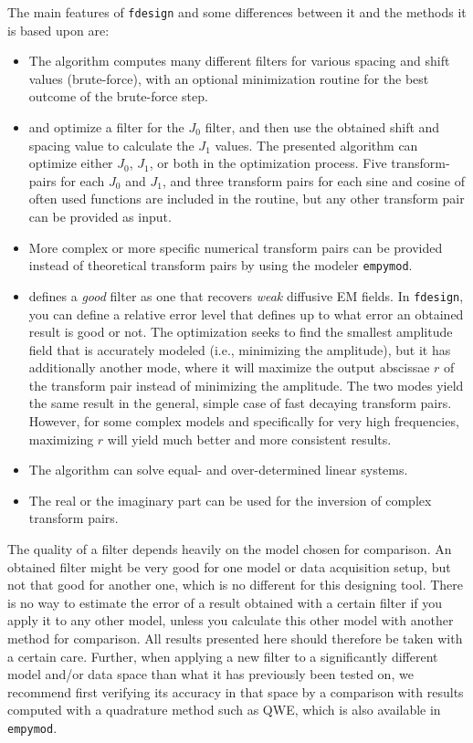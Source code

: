 \documentclass[paper,twocolumn,twoside]{geophysics}
\begin{document}
The main features of \texttt{fdesign} and some differences between it and the
methods it is based upon are:
\begin{itemize}
  \item The algorithm computes many different filters for various spacing and
    shift values (brute-force), with an optional minimization routine for
    the best outcome of the brute-force step.
  \item \cite{GP.07.Kong} and \cite{GEO.12.Key} optimize a filter for the $J_0$
    filter, and then use the obtained shift and spacing value to calculate the
    $J_1$ values. The presented algorithm can optimize either $J_0$, $J_1$, or
    both in the optimization process. Five transform-pairs for each $J_0$ and
    $J_1$, and three transform pairs for each sine and cosine of often used
    functions are included in the routine, but any other transform pair can be
    provided as input.
  \item More complex or more specific numerical transform  pairs  can be
    provided instead of theoretical transform pairs by using the modeler
    \texttt{empymod}.
  \item \cite{GP.07.Kong} defines a \emph{good} filter as one that recovers
    \emph{weak} diffusive EM fields. In  \texttt{fdesign}, you can define a
    relative error level that defines up to what error an obtained result is
    good or not. The optimization seeks to find the smallest amplitude field
    that is accurately modeled (i.e., minimizing the amplitude), but it has
    additionally another mode, where it will maximize the output abscissae $r$
    of the transform pair instead of minimizing the amplitude. The two modes
    yield the same result in the general, simple case of fast decaying
    transform pairs. However, for some complex models and specifically for very
    high frequencies, maximizing $r$ will yield much better and more consistent
    results.
  \item The algorithm can solve equal- and over-determined
    linear systems.
  \item The real or the imaginary part can be used for the inversion of complex
    transform pairs.
\end{itemize}

The quality of a filter depends heavily on the model chosen for comparison. An
obtained filter might be very good for one model or data acquisition setup, but
not that good for another one, which is no different for this designing tool.
There is no way to estimate the error of a result obtained with a certain
filter if you apply it to any other model, unless you calculate this other
model with another method for comparison. All results presented here should
therefore be taken with a certain care. Further, when applying a new filter to
a significantly different model and/or data space than what it has previously
been tested on, we recommend first verifying its accuracy in that space by a
comparison with results computed with a quadrature method such as QWE, which is
also available in \texttt{empymod}.
\end{document}
